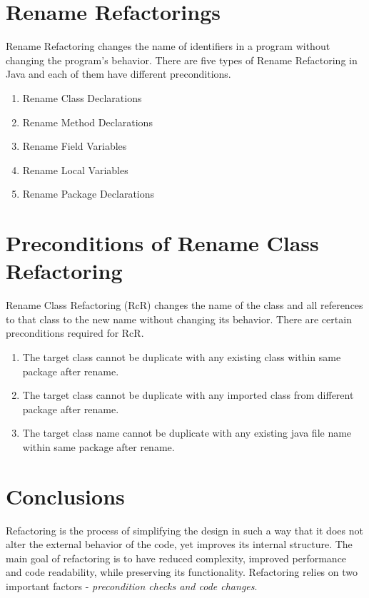 \documentclass[10pt,conference]{IEEEtran}
\begin{document}
\section{\textbf{Rename Refactorings}}
Rename Refactoring changes the name of identifiers in a program without changing the program's behavior.
There are five types of Rename Refactoring in Java and each of them have different preconditions. 
\begin{enumerate}
	\item Rename Class Declarations 
	\item Rename Method Declarations  
	\item Rename Field Variables
	\item Rename Local Variables 
	\item Rename Package Declarations
\end{enumerate}

\section{\textbf{Preconditions of Rename Class Refactoring}}
Rename Class Refactoring (RcR) changes the name of the class and all references to that class to the new name without changing its behavior. There are certain preconditions required for RcR. 
\begin{enumerate}
	\item The target class cannot be duplicate with any existing class within same package after rename.
	\item The target class cannot be duplicate with any imported class from different package after rename.
	\item The target class name cannot be duplicate with any existing java file name within same package after rename.
\end{enumerate}

\label{sec:precon1}
	
\label{sec:precon2}

\label{sec:precon3}









\section{\textbf{Conclusions}}
Refactoring is the process of simplifying the design in such a way that it does not alter the external behavior of the code, yet improves its internal structure. The main goal of refactoring is to have reduced complexity, improved performance and code readability, while preserving its functionality. Refactoring relies on two important factors -  \emph{precondition checks and code changes}.
\end{document}
